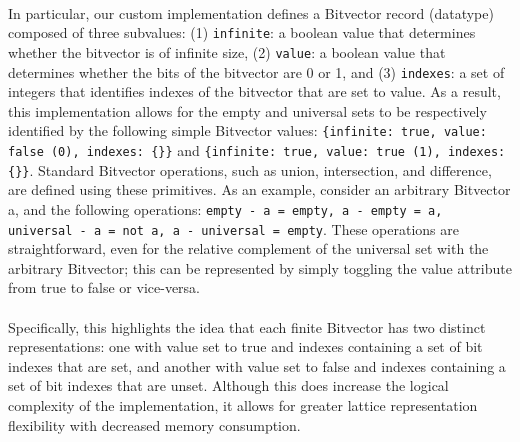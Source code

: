 \documentclass[letterpaper,11pt]{article}
\begin{document}
\paragraph{}
In particular, our custom implementation defines a Bitvector record (datatype)
composed of three subvalues: (1) \texttt{infinite}: a boolean value that determines
whether the bitvector is of infinite size, (2) \texttt{value}: a boolean value that
determines whether the bits of the bitvector are 0 or 1, and (3) \texttt{indexes}: a set
of integers that identifies indexes of the bitvector that are set to value. As
a result, this implementation allows for the empty and universal sets to be
respectively identified by the following simple Bitvector values: \texttt{\{infinite:
true, value: false (0), indexes: \{\}\}} and \texttt{\{infinite: true, value: true (1),
indexes: \{\}\}}. Standard Bitvector operations, such as union, intersection, and
difference, are defined using these primitives. As an example, consider an
arbitrary Bitvector a, and the following operations: \texttt{empty - a = empty, a -
empty = a, universal - a = not a, a - universal = empty}. These operations are
straightforward, even for the relative complement of the universal set with the
arbitrary Bitvector; this can be represented by simply toggling the value
attribute from true to false or vice-versa.

\paragraph{}
Specifically, this highlights the idea that each finite Bitvector has two
distinct representations: one with value set to true and indexes containing a
set of bit indexes that are set, and another with value set to false and
indexes containing a set of bit indexes that are unset. Although this does
increase the logical complexity of the implementation, it allows for greater
lattice representation flexibility with decreased memory consumption.
\end{document}
